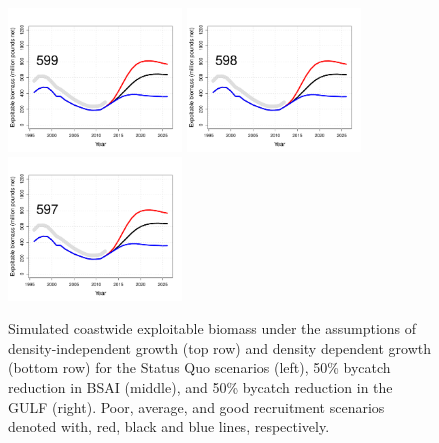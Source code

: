 \begin{figure}[htbp]
		\includegraphics[height=1.5in]{../FIGURES/fig_SQUO_DD_EBio.pdf}
		\includegraphics[height=1.5in]{../FIGURES/fig_BSAI_DD_EBio.pdf}
		\includegraphics[height=1.5in]{../FIGURES/fig_GULF_DD_EBio.pdf}		
	\caption{Simulated coastwide exploitable  biomass under the assumptions of density-independent growth (top row) and density dependent growth (bottom row) for the Status Quo scenarios (left), 50\% bycatch reduction in BSAI (middle), and 50\% bycatch reduction in the GULF (right).  Poor, average, and good recruitment scenarios denoted with, red, black and blue lines, respectively.}
	\label{fig:FIGURES_fig_SQUO_DI_EBio}
\end{figure}


